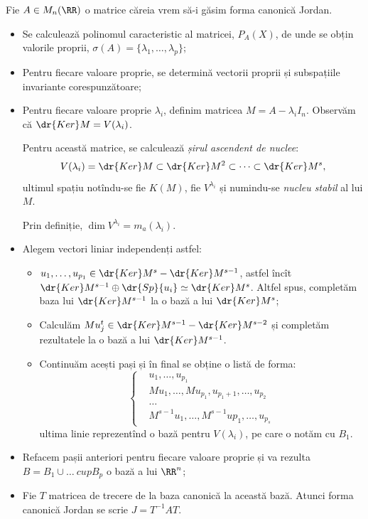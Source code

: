 Fie $A \in M_n(\RR)$ o matrice căreia vrem să-i găsim forma canonică Jordan.
\begin{itemize}
\item Se calculează polinomul caracteristic al matricei, $ P_A(X) $, de unde
  se obțin valorile proprii, $ \sigma(A) = \{ \lambda_1, \dots, \lambda_p \} $;
\item Pentru fiecare valoare proprie, se determină vectorii proprii și subspațiile
  invariante corespunzătoare;
\item Pentru fiecare valoare proprie $ \lambda_i $, definim matricea
  $ M = A - \lambda_i I_n $. Observăm că $ \dr{Ker}M = V(\lambda_i) $.

  Pentru această matrice, se calculează \emph{șirul ascendent de nuclee}:
  \[
    V(\lambda_i) = \dr{Ker}M \subset \dr{Ker}M^2 \subset \dots \subset \dr{Ker}M^s,
  \]
  ultimul spațiu notîndu-se fie $ K(M) $, fie $ V^{\lambda_i} $ și numindu-se
  \emph{nucleu stabil} al lui $ M $.

  Prin definiție, $ \dim V^{\lambda_i} = m_a(\lambda_i) $.
\item Alegem vectori liniar independenți astfel:
  \begin{itemize}
  \item $ u_1, \dots, u_{p_1} \in \dr{Ker}M^s - \dr{Ker}M^{s - 1} $, astfel încît
    $ \dr{Ker}M^{s-1} \oplus \dr{Sp} \{ u_i \} \simeq \dr{Ker}M^s $. Altfel spus,
    completăm baza lui $ \dr{Ker}M^{s-1} $ la o bază a lui $ \dr{Ker}M^s $;
  \item Calculăm $ Mu_j^t \in \dr{Ker}M^{s-1} - \dr{Ker}M^{s-2} $ și
    completăm rezultatele la o bază a lui $ \dr{Ker}M^{s-1} $.
  \item Continuăm acești pași și în final se obține o listă de forma:
    \[
      \begin{cases}
        & u_1, \dots, u_{p_1} \\
        & Mu_1, \dots, Mu_{p_1}, u_{p_1 + 1}, \dots, u_{p_2} \\
        & \dots \\
        & M^{s-1}u_1, \dots, M^{s-1} up_1, \dots, u_{p_s}
      \end{cases}
    \]
    ultima linie reprezentînd o bază pentru $ V(\lambda_i) $, pe care o notăm
    cu $ B_1 $.
  \end{itemize}
\item Refacem pașii anteriori pentru fiecare valoare proprie și va rezulta
  $ B = B_1 \cup \dots\ cup B_p $ o bază a lui $ \RR^n $;
\item Fie $ T $ matricea de trecere de la baza canonică la această bază.
  Atunci forma canonică Jordan se scrie $ J = T^{-1} AT $.
\end{itemize}


